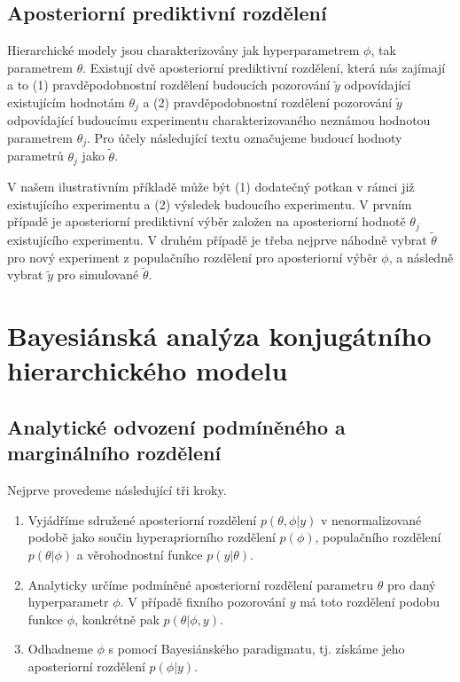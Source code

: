 \subsection{Aposteriorní prediktivní rozdělení}

Hierarchické modely jsou charakterizovány jak hyperparametrem $\phi$, tak parametrem $\theta$. Existují dvě aposteriorní prediktivní rozdělení, která nás zajímají a to (1) pravděpodobnostní rozdělení budoucích pozorování $\tilde{y}$ odpovídající existujícím hodnotám $\theta_j$ a (2) pravděpodobnostní rozdělení pozorování $\tilde{y}$ odpovídající budoucímu experimentu charakterizovaného neznámou hodnotou parametrem $\theta_j$. Pro účely následující textu označujeme budoucí hodnoty parametrů $\theta_j$ jako $\tilde{\theta}$.

V našem ilustrativním příkladě může být (1) dodatečný potkan v rámci již existujícího experimentu a (2) výsledek budoucího experimentu. V prvním případě je aposteriorní prediktivní výběr založen na aposteriorní hodnotě $\theta_j$ existujícího experimentu. V druhém případě je třeba nejprve náhodně vybrat $\tilde{\theta}$ pro nový experiment z populačního rozdělení pro aposteriorní výběr $\phi$, a následně vybrat $\tilde{y}$ pro simulované $\tilde{\theta}$.

\section{Bayesiánská analýza konjugátního hierarchického modelu}

\subsection{Analytické odvození podmíněného a marginálního rozdělení}

Nejprve provedeme následující tři kroky.
\begin{enumerate}
\item Vyjádříme sdružené aposteriorní rozdělení $p(\theta, \phi | y)$ v nenormalizované podobě jako součin hyperapriorního rozdělení $p(\phi)$, populačního rozdělení $p(\theta|\phi)$ a věrohodnostní funkce $p(y | \theta)$.
\item Analyticky určíme podmíněné aposteriorní rozdělení parametru $\theta$ pro daný hyperparametr $\phi$. V případě fixního pozorování $y$ má toto rozdělení podobu funkce $\phi$, konkrétně pak $p(\theta | \phi, y)$.
\item Odhadneme $\phi$ s pomocí Bayesiánského paradigmatu, tj. získáme jeho aposteriorní rozdělení $p(\phi|y)$.
\end{enumerate}

